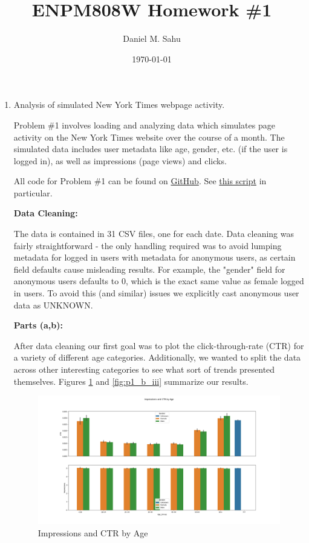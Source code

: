 \documentclass[12pt]{article}
\title{ENPM808W Homework \#1}
\author{Daniel M. Sahu}
\date{\today}
\begin{document}
\maketitle
\begin{enumerate}[leftmargin=\labelsep]
\item Analysis of simulated New York Times webpage activity.

  Problem \#1 involves loading and analyzing data which simulates page activity on the New York Times
  website over the course of a month. The simulated data includes user metadata like age, gender, etc.
  (if the user is logged in), as well as impressions (page views) and clicks.
  
  All code for Problem \#1 can be found on \href{https://github.com/danielmohansahu/data-science-exercises/tree/main/hw1}{GitHub}.
  See \href{https://github.com/danielmohansahu/data-science-exercises/blob/main/hw1/analyze_nyt.py}{this script} in particular.
  
  \textbf{Data Cleaning:}
  
  The data is contained in 31 CSV files, one for each date. Data cleaning was fairly straightforward - the only
  handling required was to avoid lumping metadata for logged in users with metadata for anonymous users, as certain
  field defaults cause misleading results. For example, the "gender" field for anonymous users defaults to $0$, which
  is the exact same value as female logged in users. To avoid this (and similar) issues we explicitly cast
  anonymous user data as UNKNOWN.

  \textbf{Parts (a,b):}
  
  After data cleaning our first goal was to plot the click-through-rate (CTR) for a variety of different age categories.
  Additionally, we wanted to split the data across other interesting categories to see what sort of trends presented
  themselves. Figures \ref{fig:p1_b_i} and \ref{fig:p1_b_iii} summarize our results.
  
  \begin{figure}[htb]
    \begin{center}
      \includegraphics[width=\textwidth]{media/p1_b_i.png}
    \end{center}
    \caption{Impressions and CTR by Age}
    \label{fig:p1_b_i}
  \end{figure}
 

\end{enumerate}
\end{document}
